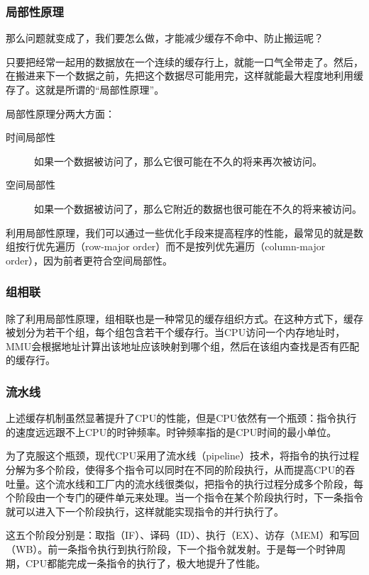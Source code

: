\documentclass[fontset=none,aspectratio=1610]{ctexbeamer}
\begin{document}
\begin{frame}
    \frametitle{局部性原理}

    那么问题就变成了，我们要怎么做，才能减少缓存不命中、防止搬运呢？

    只要把经常一起用的数据放在一个连续的缓存行上，就能一口气全带走了。然后，在搬进来下一个数据之前，先把这个数据尽可能用完，这样就能最大程度地利用缓存了。这就是所谓的“局部性原理”。

    局部性原理分两大方面：
    \begin{description}
        \item[时间局部性] 如果一个数据被访问了，那么它很可能在不久的将来再次被访问。
        \item[空间局部性] 如果一个数据被访问了，那么它附近的数据也很可能在不久的将来被访问。 
    \end{description}
    利用局部性原理，我们可以通过一些优化手段来提高程序的性能，最常见的就是数组按行优先遍历（row-major order）而不是按列优先遍历（column-major order），因为前者更符合空间局部性。
\end{frame}

\begin{frame}
    \frametitle{组相联}

    除了利用局部性原理，组相联也是一种常见的缓存组织方式。在这种方式下，缓存被划分为若干个组，每个组包含若干个缓存行。当CPU访问一个内存地址时，MMU会根据地址计算出该地址应该映射到哪个组，然后在该组内查找是否有匹配的缓存行。

\end{frame}

\begin{frame}
    \frametitle{流水线}

    上述缓存机制虽然显著提升了CPU的性能，但是CPU依然有一个瓶颈：指令执行的速度远远跟不上CPU的时钟频率。时钟频率指的是CPU时间的最小单位。

    为了克服这个瓶颈，现代CPU采用了流水线（pipeline）技术，将指令的执行过程分解为多个阶段，使得多个指令可以同时在不同的阶段执行，从而提高CPU的吞吐量。这个流水线和工厂内的流水线很类似，把指令的执行过程分成多个阶段，每个阶段由一个专门的硬件单元来处理。当一个指令在某个阶段执行时，下一条指令就可以进入下一个阶段执行，这样就能实现指令的并行执行了。

    这五个阶段分别是：取指（IF）、译码（ID）、执行（EX）、访存（MEM）和写回（WB）。前一条指令执行到执行阶段，下一个指令就发射。于是每一个时钟周期，CPU都能完成一条指令的执行了，极大地提升了性能。

\end{frame}
\end{document}
